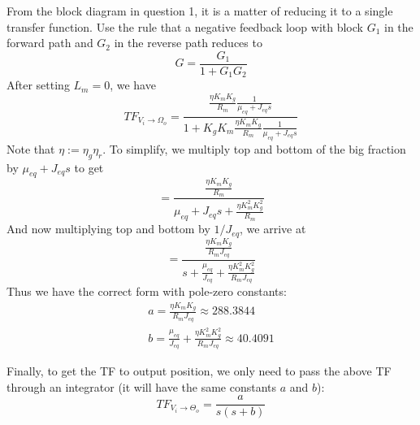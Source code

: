 \begin{Solution}{2}
        From the block diagram in question 1, it is a matter of reducing it to a single transfer function.  Use the rule that a negative feedback loop with block $G_1$ in the forward path and $G_2$ in the reverse path reduces to
        \begin{equation}
            G = \frac{G_1}{1+G_1G_2}
        \end{equation}
        After setting $L_m=0$, we have
        \begin{equation}
            TF_{V_i\to\Omega_o} =
                \frac{\frac{\eta K_m K_g}{R_m} \frac{1}{\mu_{eq} + J_{eq}s}}{ 1 + K_g K_m \frac{\eta K_m K_g}{R_m} \frac{1}{\mu_{eq} + J_{eq}s}}
        \end{equation}
        Note that $\eta := \eta_g \eta_r$.  To simplify, we multiply top and bottom of the big fraction by $\mu_{eq} + J_{eq}s$ to get
        \begin{equation}
            = \frac{
                    \frac{
                            \eta K_m K_g
                            }{
                            R_m
                            }
                    }{
                    \mu_{eq} + J_{eq}s + \frac{
                                                \eta K_m^2 K_g^2
                                                }{
                                                R_m
                                                }
                    }
        \end{equation}
        And now multiplying top and bottom by $1/J_{eq}$, we arrive at
        \begin{equation}
            = \frac{
                    \frac{
                            \eta K_m K_g
                            }{
                            R_m J_{eq}
                            }
                    }{
                    s + \frac{
                                \mu_{eq}
                                }{
                                J_{eq}
                                }
                    + \frac{
                            \eta K_m^2 K_g^2
                            }{
                            R_m J_{eq}
                            }
                    }
        \end{equation}
        Thus we have the correct form with pole-zero constants:
        \begin{subequations}
        \begin{gather}
            a = \frac{\eta K_m K_g}{R_m J_{eq}} \approx 288.3844\\
            b = \frac{\mu_{eq}}{J_{eq}} + \frac{\eta K_m^2 K_g^2}{R_m J_{eq}}
                \approx 40.4091
        \end{gather}
        \end{subequations}
        \par
        Finally, to get the TF to output position, we only need to pass the above TF through an integrator (it will have the same constants $a$ and $b$):
        \begin{equation}
            TF_{V_i\to\Theta_o} =
                \frac{a}{s(s+b)}
        \end{equation}
    
\end{Solution}
